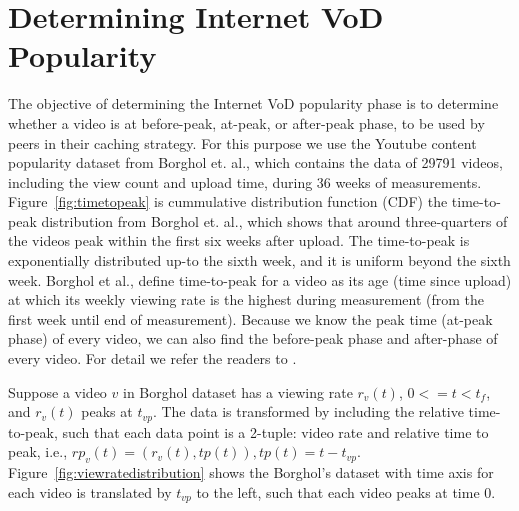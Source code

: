 \documentclass[10pt,final,journal,a4paper]{IEEEtran}
\begin{document}
\section{Determining Internet VoD Popularity}\label{popularity}

The objective of determining the Internet VoD popularity phase is to determine whether a video is at before-peak, at-peak, or after-peak phase, to be used by peers in their caching strategy.
For this purpose we use the Youtube content popularity dataset from Borghol et. al.,\cite{Borghol:2011:CMP:2039452.2039717}  which contains the data of 29791 videos, including the view count and upload time, during 36 weeks of measurements.
Figure~\ref{fig:timetopeak} is cummulative distribution function (CDF) the time-to-peak distribution from Borghol et. al.,\cite{Borghol:2011:CMP:2039452.2039717}  which shows that around three-quarters of the videos peak within the first six weeks after upload.
The time-to-peak is exponentially distributed up-to the sixth week, and it is uniform beyond the sixth week.
Borghol et al., \cite{Borghol:2011:CMP:2039452.2039717} define time-to-peak for a video as its age (time since upload) at which its weekly viewing rate is the highest during measurement (from the first week until end of measurement).
Because we know the peak time (at-peak phase) of every video, we can also find the before-peak phase and after-phase of every video. 
For detail we refer the readers to \cite{Borghol:2011:CMP:2039452.2039717}.

Suppose a video $v$ in Borghol dataset has a viewing rate $r_v(t)$, $0 <= t < t_f$, and $r_v(t)$ peaks at $t_{vp}$.
The data is transformed by including the relative time-to-peak, such that each data point is a 2-tuple: video rate and relative time to peak, i.e., $rp_v(t) = ( r_v(t), tp(t) ), tp(t) = t - t_{vp}$.
Figure~\ref{fig:viewratedistribution} shows the Borghol's dataset with time axis for each video is translated by $t_{vp}$ to the left, such that each video peaks at time $0$.


\end{document}
